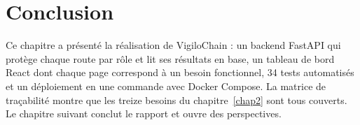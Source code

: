 \section*{Conclusion}
Ce chapitre a présenté la réalisation de VigiloChain : un backend FastAPI qui
protège chaque route par rôle et lit ses résultats en base, un tableau de bord
React dont chaque page correspond à un besoin fonctionnel, 34 tests
automatisés et un déploiement en une commande avec Docker Compose. La matrice
de traçabilité montre que les treize besoins du chapitre~\ref{chap2} sont tous
couverts. Le chapitre suivant conclut le rapport et ouvre des perspectives.
